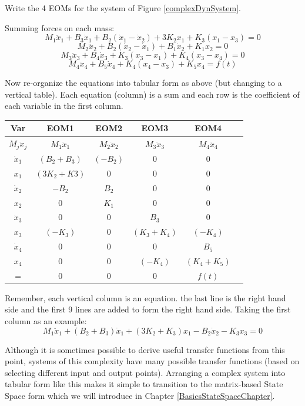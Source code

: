 \begin{Example}
  Write the 4 EOMs for the system of Figure \ref{complexDynSystem}.

Summing forces on each mass:
\[
M_1\ddot{x}_1 + B_3\dot{x}_1+B_2(\dot{x}_1-\dot{x}_2) +3K_2x_1+K_3(x_1-x_3)  = 0
\]
\[
M_2\ddot{x}_2 + B_2(\dot{x}_2-\dot{x}_1)+B_1\dot{x}_2+K_1x_2 = 0
\]
\[
M_3\ddot{x}_3 + B_4\dot{x}_3+K_3(x_3-x_1)+K_4(x_3-x_4)=0
\]
\[
M_4\ddot{x}_4+B_5\dot{x}_4+K_4(x_4-x_3)+K_5x_4 = f(t)
\]


Now re-organize the equations into tabular form as above (but changing to a vertical table).   Each equation (column) is a sum and each row is the coefficient of
each variable in the first column.

\begin{tabular}{|c|c|c|c|c|c|}\hline
  Var           & EOM1 & EOM2 & EOM3 & EOM4\\\hline
  $M_j\ddot{x}_j$  & $M_1\ddot{x}_1$&$M_2\ddot{x}_2$&$M_3\ddot{x}_3$ &$M_4\ddot{x}_4$ \\ \hline
  $\dot{x}_1$   & $(B_2+B_3)$ &$(-B_2)$  & 0           & 0 \\ \hline
        $x_1$   & $(3K_2+K3)$ &0         & 0           & 0 \\ \hline
  $\dot{x}_2$   & $-B_2$      & $B_2$    & 0           & 0 \\ \hline
        $x_2$   & 0           & $K_1$    & 0           & 0 \\ \hline
  $\dot{x}_3$   & 0           & 0        & $B_3$       & 0 \\ \hline
        $x_3$   & $(-K_3)$    & 0        & $(K_3+K_4)$ & $(-K_4)$ \\ \hline
  $\dot{x}_4$   & 0           & 0        & 0           & $B_5$    \\ \hline
        $x_4$   & 0           & 0        & $(-K_4)$    & $(K_4+K_5)$ \\ \hline\hline
        =       & 0  & 0  & 0 & $f(t)$ \\ \hline
\end{tabular}


Remember, each vertical column is an equation.  the last line is the right
hand side and the first 9 lines are added to form the right hand side.
Taking the first column as an example:
\[
M_1\ddot{x}_1+(B_2+B_3)\dot{x}_1+(3K_2+K_3)x_1-B_2\dot{x}_2 -K_3x_3 = 0
\]

\end{Example}

Although it is sometimes possible to derive useful transfer functions from
this point, systems of this complexity have many possible transfer functions
(based on selecting different input and output points).
Arranging a complex
system into tabular form like this makes it simple to transition to
the matrix-based State Space form which we will introduce in Chapter
\ref{BasicsStateSpaceChapter}.

